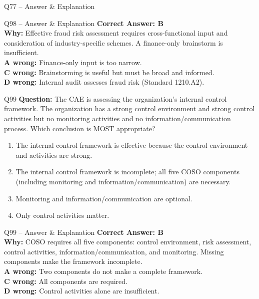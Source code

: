 \documentclass[aspectratio=169,10pt]{beamer}
\begin{document}
\begin{frame}[t]{Q77 -- Answer \& Explanation}
	\begin{frame}[t]{Q98 -- Answer \& Explanation}
		\small
		\textbf{Correct Answer: B} \\[4pt]
		\textbf{Why:} Effective fraud risk assessment requires cross-functional input and consideration of industry-specific schemes. A finance-only brainstorm is insufficient. \\[4pt]
		\textbf{A wrong:} Finance-only input is too narrow. \\[2pt]
		\textbf{C wrong:} Brainstorming is useful but must be broad and informed. \\[2pt]
		\textbf{D wrong:} Internal audit assesses fraud risk (Standard 1210.A2).
	\end{frame}
	
	\begin{frame}[t]{Q99}
		\small
		\textbf{Question:} The CAE is assessing the organization's internal control framework. The organization has a strong control environment and strong control activities but no monitoring activities and no information/communication process. Which conclusion is MOST appropriate?
		\begin{enumerate}[label=\Alph*.,itemsep=1pt,topsep=2pt]
			\item The internal control framework is effective because the control environment and activities are strong.
			\item The internal control framework is incomplete; all five COSO components (including monitoring and information/communication) are necessary.
			\item Monitoring and information/communication are optional.
			\item Only control activities matter.
		\end{enumerate}
	\end{frame}
	
	\begin{frame}[t]{Q99 -- Answer \& Explanation}
		\small
		\textbf{Correct Answer: B} \\[4pt]
		\textbf{Why:} COSO requires all five components: control environment, risk assessment, control activities, information/communication, and monitoring. Missing components make the framework incomplete. \\[4pt]
		\textbf{A wrong:} Two components do not make a complete framework. \\[2pt]
		\textbf{C wrong:} All components are required. \\[2pt]
		\textbf{D wrong:} Control activities alone are insufficient.
	\end{frame}
	

\end{frame}
\end{document}
